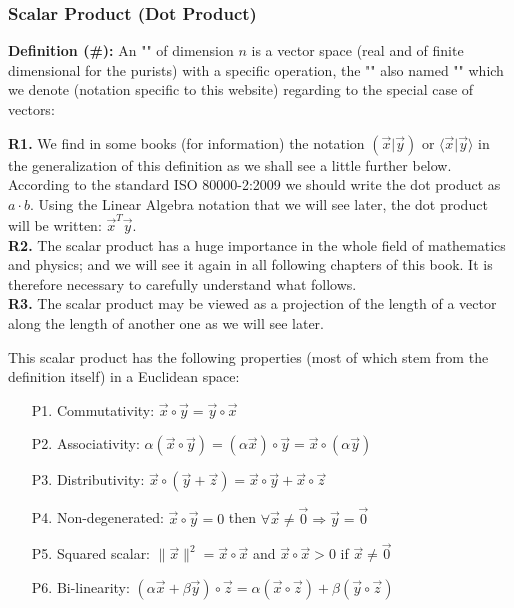 	\pagebreak	
	\subsubsection{Scalar Product (Dot Product)}\label{dot product}
	\textbf{Definition (\#\mydef):} An "" of dimension $n$ is a vector space (real and of finite dimensional for the purists) with a specific operation, the "" also named "" which we denote (notation specific to this website) regarding to the special case of vectors:
	
	\begin{tcolorbox}[title=Remarks,colframe=black,arc=10pt]
	\textbf{R1.} We find in some books (for information) the notation $\left( \vec{x}|\vec{y}\right)$ or $\langle \vec{x} | \vec{y} \rangle$ in the generalization of this definition as we shall see a little further below. According to the standard ISO 80000-2:2009 we should write the dot product as $a\cdot b$. Using the Linear Algebra notation that we will see later, the dot product will be written: $\vec{x}^T\vec{y}$.\\
	
	\textbf{R2.} The scalar product has a huge importance in the whole field of mathematics and physics; and we will see it again in all following chapters of this book. It is therefore necessary to carefully understand what follows.\\
	
	\textbf{R3.} The scalar product may be viewed as a projection of the length of a vector along the length of another one as we will see later.
	\end{tcolorbox}	
	This scalar product has the following properties (most of which stem from the definition itself) in a Euclidean space:
	\begin{enumerate}
		\item[P1.] Commutativity: $\vec{x}\circ\vec{y}=\vec{y}\circ\vec{x}$
		\item[P2.] Associativity: $\alpha(\vec{x}\circ\vec{y})=(\alpha\vec{x})\circ\vec{y}=\vec{x}\circ(\alpha\vec{y}) $
		\item[P3.] Distributivity: $\vec{x}\circ(\vec{y}+\vec{z})=\vec{x}\circ\vec{y}+\vec{x}\circ\vec{z}$
		\item[P4.] Non-degenerated: $\vec{x}\circ\vec{y}=0$ then $\forall\vec{x}\neq\vec{0}\Rightarrow \vec{y}=\vec{0}$
		\item[P5.] Squared scalar: $\|\vec{x}\|^2=\vec{x}\circ\vec{x}$ and $\vec{x}\circ\vec{x}>0$ if $\vec{x}\neq \vec{0}$
		\item[P6.] Bi-linearity: $(\alpha\vec{x}+\beta\vec{y})\circ\vec{z}=\alpha(\vec{x}\circ	\vec{z})+\beta(\vec{y}\circ\vec{z})$
	\end{enumerate}
